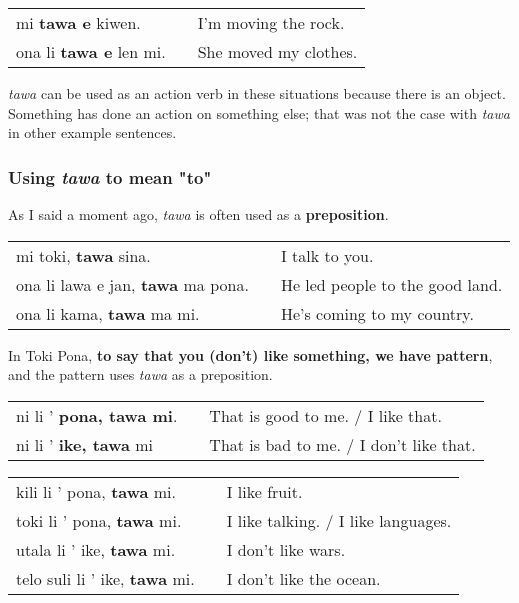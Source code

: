 \begin{supertabular}{p{5,5cm}|ll}
mi \textbf{tawa e} kiwen. && I'm moving the rock. \\
ona li \textbf{tawa e} len mi. && She moved my clothes. \\
\end{supertabular} 

\textit{tawa} can be used as an action verb in these situations because there is an object. 
Something has done an action on something else; that was not the case with \textit{tawa} in other example sentences. 

%
\subsubsection*{Using \textit{tawa} to mean "to"}
%
As I said a moment ago, \textit{tawa} is often used as a \textbf{preposition}. 

\begin{supertabular}{p{5,5cm}|ll}
mi toki, \textbf{tawa} sina. && I talk to you. \\
ona li lawa e jan, \textbf{tawa} ma pona. && He led people to the good land. \\
ona li kama, \textbf{tawa} ma mi. && He's coming to my country. \\
\end{supertabular} 

In Toki Pona, \textbf{to say that you (don't) like something, we have pattern}, and the pattern uses \textit{tawa} as a preposition.

\begin{supertabular}{p{5,5cm}|ll}
ni li ' \textbf{pona, tawa mi}. && That is good to me. / I like that. \\
ni li ' \textbf{ike, tawa} mi && That is bad to me. / I don't like that. \\
\end{supertabular} 

\begin{supertabular}{p{5,5cm}|ll}
kili li ' pona, \textbf{tawa} mi. && I like fruit. \\
toki li ' pona, \textbf{tawa} mi. && I like talking. / I like languages. \\
utala li ' ike, \textbf{tawa} mi. && I don't like wars. \\
telo suli li ' ike, \textbf{tawa} mi. && I don't like the ocean. \\
\end{supertabular} 

